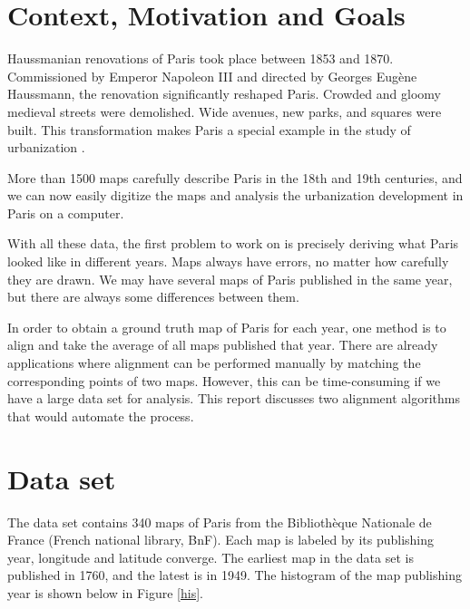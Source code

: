 


\section{Context, Motivation and Goals}

Haussmanian renovations of Paris took place between 1853 and 1870. Commissioned by Emperor Napoleon III and directed by Georges Eugène Haussmann, the renovation significantly reshaped Paris. Crowded and gloomy medieval streets were demolished. Wide avenues, new parks, and squares were built. This transformation makes Paris a special example in the study of urbanization \cite{wiki_haussmanns}.

More than 1500 maps carefully describe Paris in the 18th and 19th centuries, and we can now easily digitize the maps and analysis the urbanization development in Paris on a computer. 

With all these data, the first problem to work on is precisely deriving what Paris looked like in different years. Maps always have errors, no matter how carefully they are drawn. We may have several maps of Paris published in the same year, but there are always some differences between them. 

In order to obtain a ground truth map of Paris for each year, one method is to align and take the average of all maps published that year. There are already applications where alignment can be performed manually by matching the corresponding points of two maps. However, this can be time-consuming if we have a large data set for analysis. This report discusses two alignment algorithms that would automate the process.

\section{Data set}

The data set contains 340 maps of Paris from the Bibliothèque Nationale de France (French national library, BnF). Each map is labeled by its publishing year, longitude and latitude converge. The earliest map in the data set is published in 1760, and the latest is in 1949. The histogram of the map publishing year is shown below in Figure \ref{his}.

